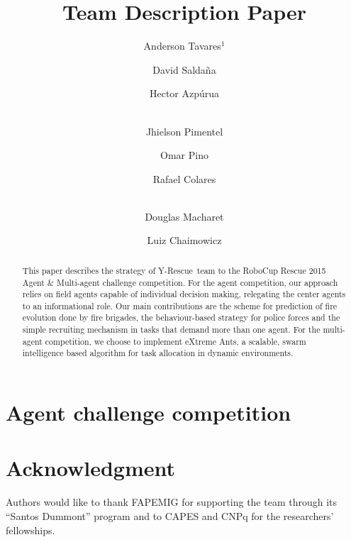 \documentclass[a4paper, 10pt, conference]{ieeeconf}      %
\title{\teamname Team Description Paper}
\author{Anderson Tavares$^{1}$ \and David Saldaña \and Hector Azpúrua \and\\ Jhielson Pimentel \and Omar Pino \and Rafael Colares \and \\
Douglas Macharet \and Luiz Chaimowicz 
}
\newcommand{\teamname}{Y-Rescue~}
\begin{document}
\maketitle

\begin{abstract}
This paper describes the strategy of \teamname team to the RoboCup Rescue 2015 Agent \& Multi-agent challenge competition. %
For the agent competition, our approach relies on field agents capable of individual decision making, relegating the center agents to an informational role. Our main contributions are the scheme for prediction of fire evolution done by fire brigades, the behaviour-based strategy for police forces and the simple recruiting mechanism in tasks that demand more than one agent. For the multi-agent competition, we choose to implement eXtreme Ants, a scalable, swarm intelligence based algorithm for task allocation in dynamic environments.
\end{abstract}




\section{Agent challenge competition}
\label{sec:agent}




















\section*{Acknowledgment}
\label{sec:ack}
Authors would like to thank FAPEMIG for supporting the team through its ``Santos Dummont'' program and to CAPES and CNPq for the researchers' fellowships.


%

\end{document}
